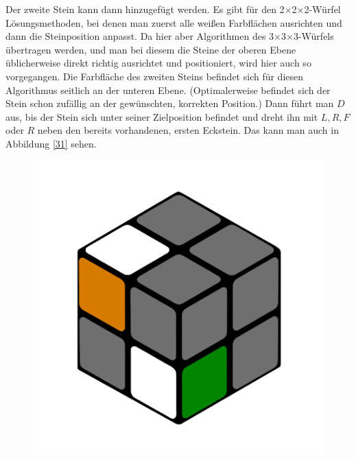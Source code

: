 \documentclass[12pt,a4paper, usenames, dvipsnames]{article}
\theoremstyle{mystyle}
\theoremstyle{definition}
\newcommand{\Ttwo}{2$\times$2$\times$2-}
\newcommand{\Tthree}{3$\times$3$\times$3-}
\begin{document}
Der zweite Stein kann dann hinzugefügt werden. Es gibt für den \Ttwo Würfel Lösungsmethoden, bei denen man zuerst alle weißen Farbflächen ausrichten und dann die Steinposition anpasst.
Da hier aber Algorithmen des \Tthree Würfels übertragen werden, und man bei diesem die Steine der oberen Ebene üblicherweise direkt richtig ausrichtet und positioniert, wird hier auch so vorgegangen.
Die Farbfläche des zweiten Steins befindet sich für diesen Algorithmus seitlich an der unteren Ebene. (Optimalerweise befindet sich der Stein schon zufällig an der gewünschten, korrekten Position.)
Dann führt man $D$ aus, bis der Stein sich unter seiner Zielposition befindet und dreht ihn mit $L, R, F$ oder $R$ neben den bereits vorhandenen, ersten Eckstein. Das kann man auch in Abbildung \ref{31} sehen.

\begin{figure}[H]
\centering
\includegraphics[scale=0.1]{e1_s2_s1.png}

\end{figure}
\end{document}
